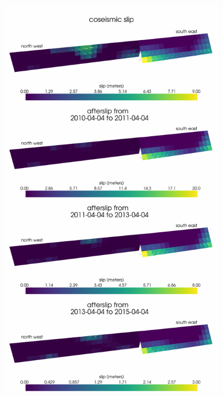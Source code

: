 \documentclass[1p]{elsarticle}
\begin{document}
\begin{figure}
\includegraphics[scale=0.7]{Figures/ElasticSlip}
\caption{}
\label{fig:ElasticSlip}
\end{figure}
\end{document}
